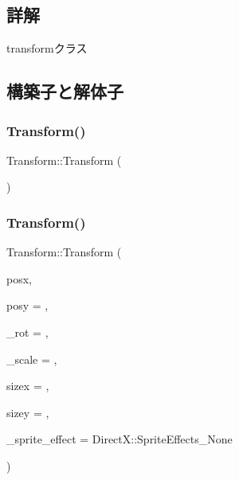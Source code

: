 \subsection{詳解}
transformクラス 

\subsection{構築子と解体子}
\mbox{\label{class_transform_aa08ca4266efabc768973cdeea51945ab}} 
\subsubsection{\texorpdfstring{Transform()}{Transform()}\hspace{0.1cm}{\footnotesize\ttfamily [1/4]}}
{\footnotesize\ttfamily Transform\+::\+Transform (\begin{DoxyParamCaption}{ }\end{DoxyParamCaption})\hspace{0.3cm}{\ttfamily [inline]}}

\mbox{\label{class_transform_a1ef60253d5f6ab5d263f217dfb76f27e}} 
\subsubsection{\texorpdfstring{Transform()}{Transform()}\hspace{0.1cm}{\footnotesize\ttfamily [2/4]}}
{\footnotesize\ttfamily Transform\+::\+Transform (\begin{DoxyParamCaption}\item[{const float}]{posx,  }\item[{const float}]{posy = {},  }\item[{const float}]{\+\_\+rot = {},  }\item[{const float}]{\+\_\+scale = {},  }\item[{const float}]{sizex = {},  }\item[{const float}]{sizey = {},  }\item[{const Direct\+X\+::\+Sprite\+Effects}]{\+\_\+sprite\+\_\+effect = {\ttfamily DirectX\+:\+:SpriteEffects\+\_\+None} }\end{DoxyParamCaption})}




